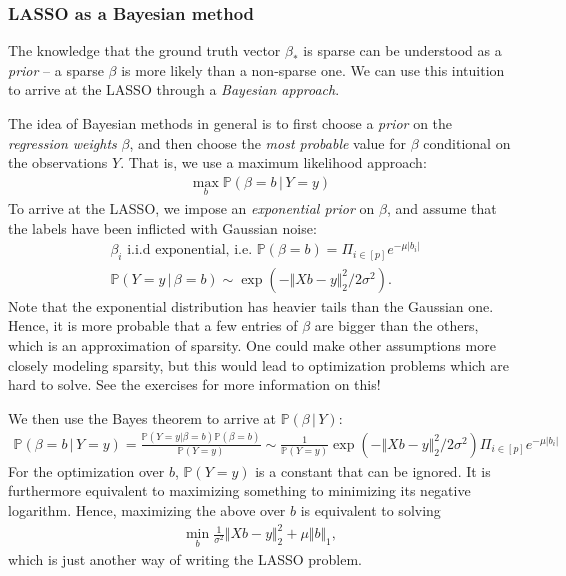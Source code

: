 \documentclass{article}
\newcommand{\abs}[1]{\vert #1 \vert}
\newcommand{\norm}[1]{\Vert #1 \Vert}
\begin{document}
\subsubsection{LASSO as a Bayesian method} The knowledge that the ground truth vector $\beta_*$ is sparse can be understood as a \emph{prior} -- a sparse $\beta$ is more likely than a non-sparse one. We can use this intuition to arrive at the LASSO through a \emph{Bayesian approach}.

The idea of Bayesian methods in general is to first choose a \emph{prior} on the \emph{regression weights} $\beta$, and then choose the \emph{most probable} value for $\beta$ conditional on the observations $Y$. That is, we use a maximum likelihood approach:
\begin{align*}
    \max_{b} \mathbb{P}(\beta = b \, \vert \,Y=y)
\end{align*}
To arrive at the LASSO, we impose an \emph{exponential prior} on $\beta$, and assume that the labels have been inflicted with Gaussian noise:
\begin{align}
    &\beta_i \text{ i.i.d exponential, i.e. } \mathbb{P}(\beta = b) = \Pi_{i\in [p]}e^{-\mu\abs{b_i}} \\
    &\mathbb{P}(Y=y\, \vert \, \beta=b) \sim \exp(-\norm{Xb-y}^2_2/2\sigma^2).
\end{align}
Note that the exponential distribution has heavier tails than the Gaussian one. Hence, it is more probable that a few entries of $\beta$ are bigger than the others, which is an approximation of sparsity. One could make other assumptions more closely modeling sparsity, but this would lead to optimization problems which are hard to solve. See the exercises for more information on this!

We then use the Bayes theorem to arrive at $\mathbb{P}(\beta \, \vert \, Y)$:
\begin{align*}
     \mathbb{P}(\beta =b\, \vert \, Y=y) = \frac{\mathbb{P}(Y =y\vert \beta=b)\mathbb{P}(\beta=b)}{\mathbb{P}(Y=y)} \sim \frac{1}{\mathbb{P}(Y=y)}  \exp(-\norm{Xb-y}^2_2/2\sigma^2)\Pi_{i\in [p]}e^{-\mu\abs{b_i}}
\end{align*}
For the optimization over $b$, $\mathbb{P}(Y=y)$ is a constant that can be ignored. It is furthermore equivalent to maximizing something to minimizing its negative logarithm. Hence, maximizing the above over $b$ is equivalent to solving
\begin{align*}
    \min_{b}\tfrac{1}{\sigma^2} \norm{Xb-y}_2^2 + \mu\norm{b}_1,
\end{align*}
which is just another way of writing the LASSO problem.
\end{document}
